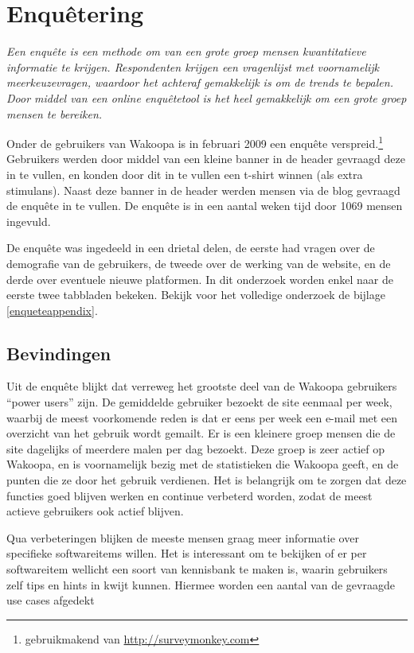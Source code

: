 \documentclass[a4paper, 10pt, pdftex]{report}
\begin{document}
    \section{Enqu\^etering}
    \textit{Een enqu\^ete is een methode om van een grote groep mensen kwantitatieve informatie te krijgen. Respondenten krijgen een vragenlijst met voornamelijk meerkeuzevragen, waardoor het achteraf gemakkelijk is om de trends te bepalen. Door middel van een online enqu\^etetool is het heel gemakkelijk om een grote groep mensen te bereiken.}

    Onder de gebruikers van Wakoopa is in februari 2009 een enqu\^ete verspreid.\footnote{gebruikmakend van \url{http://surveymonkey.com}} Gebruikers werden door middel van een kleine banner in de header gevraagd deze in te vullen, en konden door dit in te vullen een t-shirt winnen (als extra stimulans). Naast deze banner in de header werden mensen via de blog gevraagd de enqu\^ete in te vullen. De enqu\^ete is in een aantal weken tijd door 1069 mensen ingevuld.

    De enqu\^ete was ingedeeld in een drietal delen, de eerste had vragen over de demografie van de gebruikers, de tweede over de werking van de website, en de derde over eventuele nieuwe platformen. In dit onderzoek worden enkel naar de eerste twee tabbladen bekeken. Bekijk voor het volledige onderzoek de bijlage \ref{enqueteappendix}.
  \subsection{Bevindingen}
    Uit de enqu\^ete blijkt dat verreweg het grootste deel van de Wakoopa gebruikers ``power users'' zijn. De gemiddelde gebruiker bezoekt de site eenmaal per week, waarbij de meest voorkomende reden is dat er eens per week een e-mail met een overzicht van het gebruik wordt gemailt. Er is een kleinere groep mensen die de site dagelijks of meerdere malen per dag bezoekt. Deze groep is zeer actief op Wakoopa, en is voornamelijk bezig met de statistieken die Wakoopa geeft, en de punten die ze door het gebruik verdienen. Het is belangrijk om te zorgen dat deze functies goed blijven werken en continue verbeterd worden, zodat de meest actieve gebruikers ook actief blijven.

    Qua verbeteringen blijken de meeste mensen graag meer informatie over specifieke softwareitems willen. Het is interessant om te bekijken of er per softwareitem wellicht een soort van kennisbank te maken is, waarin gebruikers zelf tips en hints in kwijt kunnen. Hiermee worden een aantal van de gevraagde use cases afgedekt
\end{document}
